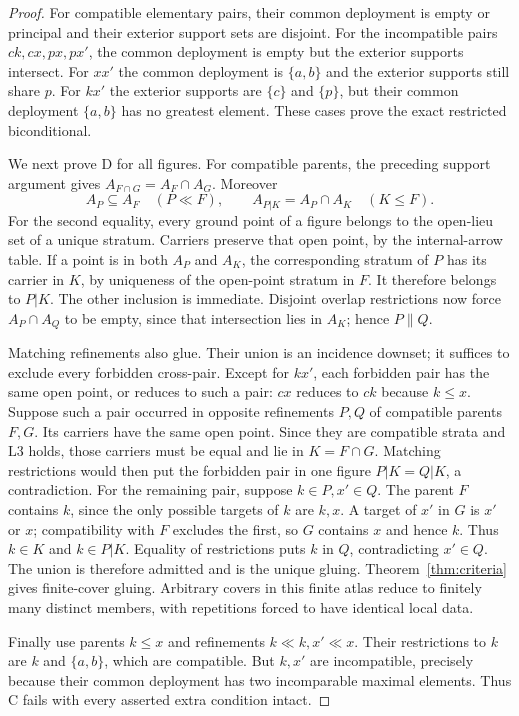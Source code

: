 \begin{proof}
For compatible elementary pairs, their common deployment is
empty or principal and their exterior support sets are disjoint.
For the incompatible pairs $ck,cx,px,px'$, the common deployment
is empty but the exterior supports intersect. For $xx'$ the
common deployment is $\{a,b\}$ and the exterior supports still
share $p$. For $kx'$ the exterior supports are $\{c\}$ and
$\{p\}$, but their common deployment $\{a,b\}$ has no greatest
element. These cases prove the exact restricted biconditional.

We next prove $\mathrm D$ for all figures. For compatible
parents, the preceding support argument gives
$A_{F\cap G}=A_F\cap A_G$. Moreover
\[
 A_P\subseteq A_F\quad(P\ll F),\qquad
 A_{P|K}=A_P\cap A_K\quad(K\leq F).
\]
For the second equality, every ground point of a figure belongs
to the open-lieu set of a unique stratum. Carriers preserve that
open point, by the internal-arrow table. If a point is in both
$A_P$ and $A_K$, the corresponding stratum of $P$ has its carrier
in $K$, by uniqueness of the open-point stratum in $F$. It
therefore belongs to $P|K$. The other inclusion is immediate.
Disjoint overlap restrictions now force $A_P\cap A_Q$ to be
empty, since that intersection lies in $A_K$; hence $P\parallel Q$.

Matching refinements also glue. Their union is an incidence
downset; it suffices to exclude every forbidden cross-pair.
Except for $kx'$, each forbidden pair has the same open point,
or reduces to such a pair: $cx$ reduces to $ck$ because
$k\leq x$. Suppose such a pair occurred in opposite refinements
$P,Q$ of compatible parents $F,G$. Its carriers have the same
open point. Since they are compatible strata and $\mathrm L3$
holds, those carriers must be equal and lie in $K=F\cap G$.
Matching restrictions would then put the forbidden pair in
one figure $P|K=Q|K$, a contradiction.
For the remaining pair, suppose $k\in P,x'\in Q$.
The parent $F$ contains $k$, since the only possible targets
of $k$ are $k,x$. A target of $x'$ in $G$ is $x'$ or $x$;
compatibility with $F$ excludes the first, so $G$ contains $x$
and hence $k$. Thus $k\in K$ and $k\in P|K$. Equality of
restrictions puts $k$ in $Q$, contradicting $x'\in Q$.
The union is therefore admitted and is the unique gluing.
Theorem~\ref{thm:criteria} gives finite-cover gluing. Arbitrary
covers in this finite atlas reduce to finitely many distinct
members, with repetitions forced to have identical local data.

Finally use parents $k\leq x$ and refinements $k\ll k,x'\ll x$.
Their restrictions to $k$ are $k$ and $\{a,b\}$, which are
compatible. But $k,x'$ are incompatible, precisely because their
common deployment has two incomparable maximal elements.
Thus $\mathrm C$ fails with every asserted extra condition intact.
\end{proof}
